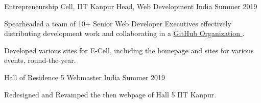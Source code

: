 \begin{cventries}

  \cventry
  {Entrepreneurship Cell, IIT Kanpur}
  {Head, Web Development}
  {India}
  {Summer 2019}
  {
    \begin{cvitems}
    \item Spearheaded a team of 10+ Senior Web Developer Executives effectively distributing development work and collaborating in a \href{https://github.com/ECell-IITK/}{GitHub Organization \ExternalLink}.
    \item Developed various sites for E-Cell, including the homepage and sites for various events, round-the-year.
    \end{cvitems}
  }

  \cventry
  {Hall of Residence 5}
  {Webmaster}
  {India}
  {Summer 2019}
  {
    \begin{cvitems}
    \item Redesigned and Revamped the then webpage of Hall 5 IIT Kanpur. 
    \end{cvitems}
  }
\end{cventries}



